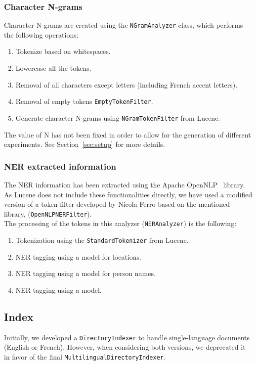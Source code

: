 \subsubsection{Character N-grams}
Character N-grams are created using the \texttt{NGramAnalyzer} class, which performs the following operations:
\begin{enumerate}
    \item Tokenize based on whitespaces.
    \item Lowercase all the tokens.
    \item Removal of all characters except letters (including French accent letters).
    \item Removal of empty tokens \texttt{EmptyTokenFilter}.
    \item Generate character N-grams using \texttt{NGramTokenFilter} from Lucene.
\end{enumerate}
The value of N has not been fixed in order to allow for the generation of different experiments.
See Section~\ref{sec:setup} for more details.

\subsubsection{NER extracted information}
The NER information has been extracted using the Apache OpenNLP~\cite{ApacheOpenNLP} library.
As Lucene does not include these functionalities directly, we have used a modified version of a token filter developed
by Nicola Ferro based on the mentioned library, (\texttt{OpenNLPNERFilter}).\\

The processing of the tokens in this analyzer (\texttt{NERAnalyzer}) is the following:
\begin{enumerate}
    \item Tokenization using the \texttt{StandardTokenizer} from Lucene.
    \item NER tagging using a model for locations.
    \item NER tagging using a model for person names.
    \item NER tagging using a model.
\end{enumerate}

\subsection{Index}\label{subsec:index}
Initially, we developed a \texttt{DirectoryIndexer} to handle single-language documents (English or French). 
However, when considering both versions, we deprecated it in favor of the final \texttt{MultilingualDirectoryIndexer}.\\

